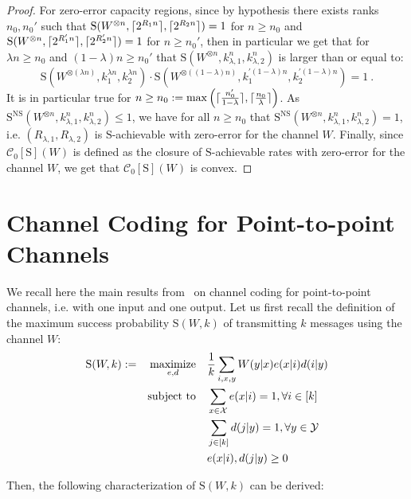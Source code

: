 \begin{proof}
For zero-error capacity regions, since by hypothesis there exists ranks $n_0,n_0'$ such that $\mathrm{S}(W^{\otimes n},\lceil2^{R_1n}\rceil,\lceil2^{R_2n}\rceil) = 1$ for $n \geq n_0$ and $\mathrm{S}(W^{\otimes n},\lceil2^{R_1'n}\rceil,\lceil2^{R_2'n}\rceil) = 1$ for $n \geq n_0'$, then in particular we get that for $\lambda n \geq n_0$ and $(1-\lambda) n \geq n_0'$ that $\mathrm{S}(W^{\otimes n},k^n_{\lambda,1},k^n_{\lambda, 2})$ is larger than or equal to:
\[ \mathrm{S}(W^{\otimes (\lambda n)}, k_1^{\lambda n}, k_2^{\lambda n}) \cdot \mathrm{S}(W^{\otimes ((1-\lambda) n)}, k_1^{\prime (1-\lambda) n}, k_2^{\prime (1-\lambda) n}) = 1 \ .\]
It is in particular true for $n \geq n_0 := \max\left(\lceil\frac{n_0'}{1-\lambda}\rceil,\lceil\frac{n_0}{\lambda}\rceil\right)$. As $\mathrm{S}^{\mathrm{NS}}(W^{\otimes n},k^n_{\lambda,1},k^n_{\lambda,2}) \leq 1$, we have  for all $n \geq n_0$ that $\mathrm{S}^{\mathrm{NS}}(W^{\otimes n},k^n_{\lambda,1},k^n_{\lambda,2}) = 1$, i.e. $(R_{\lambda,1},R_{\lambda,2})$ is $\mathrm{S}$-achievable with zero-error for the channel $W$.  Finally, since $\mathcal{C}_0[\mathrm{S}](W)$ is defined as the closure of $\mathrm{S}$-achievable rates with zero-error for the channel $W$, we get that $\mathcal{C}_0[\mathrm{S}](W)$ is convex.
\end{proof}
 
\section{Channel Coding for Point-to-point Channels}
\label{subsection:onewaychannelcoding} 
We recall here the main results from~\cite{BF18} on channel coding for point-to-point channels, i.e. with one input and one output. Let us first recall the definition of the maximum success probability $\mathrm{S}(W,k)$ of transmitting $k$ messages using the channel $W$:
\begin{equation}
  \begin{aligned}
    \mathrm{S}(W,k) := &&\underset{e,d}{\operatorname{\text{maximize}}} &&& \frac{1}{k} \sum_{i,x,y} W(y|x)e(x|i)d(i|y)\\
    &&\operatorname{\text{subject to}} &&& \sum_{x \in \mathcal{X}} e(x|i) = 1, \forall i \in [k]\\
    &&&&& \sum_{j \in [k]} d(j|y) = 1, \forall y \in \mathcal{Y}\\
    &&&&& e(x|i), d(j|y) \geq 0
  \end{aligned}
\end{equation}

Then, the following characterization of $\mathrm{S}(W,k)$ can be derived:

